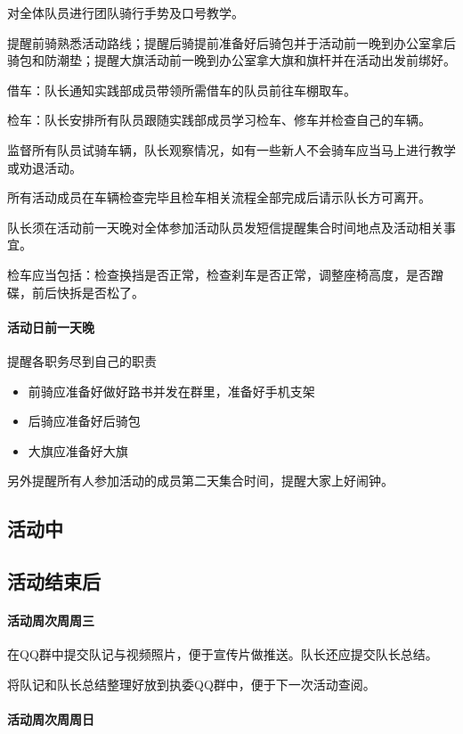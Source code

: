 \documentclass{ctexbook}
\begin{document}
对全体队员进行团队骑行手势及口号教学。

提醒前骑熟悉活动路线；提醒后骑提前准备好后骑包并于活动前一晚到办公室拿后骑包和防潮垫；提醒大旗活动前一晚到办公室拿大旗和旗杆并在活动出发前绑好。

借车：队长通知实践部成员带领所需借车的队员前往车棚取车。

检车：队长安排所有队员跟随实践部成员学习检车、修车并检查自己的车辆。

监督所有队员试骑车辆，队长观察情况，如有一些新人不会骑车应当马上进行教学或劝退活动。

所有活动成员在车辆检查完毕且检车相关流程全部完成后请示队长方可离开。

队长须在活动前一天晚对全体参加活动队员发短信提醒集合时间地点及活动相关事宜。

检车应当包括：检查换挡是否正常，检查刹车是否正常，调整座椅高度，是否蹭碟，前后快拆是否松了。
\paragraph{活动日前一天晚}

提醒各职务尽到自己的职责

\begin{itemize}
    \item 前骑应准备好做好路书并发在群里，准备好手机支架
    \item 后骑应准备好后骑包
    \item 大旗应准备好大旗
\end{itemize}

另外提醒所有人参加活动的成员第二天集合时间，提醒大家上好闹钟。
\subsection{活动中}
\subsection{活动结束后}
\paragraph{活动周次周周三}

在QQ群中提交队记与视频照片，便于宣传片做推送。队长还应提交队长总结。

将队记和队长总结整理好放到执委QQ群中，便于下一次活动查阅。

\paragraph{活动周次周周日}
\end{document}
